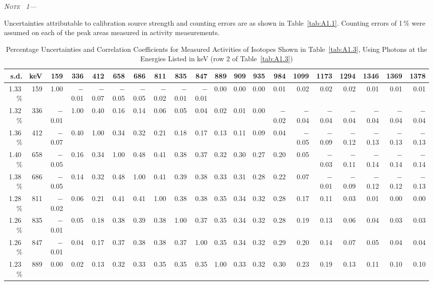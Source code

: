 \documentclass[12pt]{article}
\newenvironment{astmnote}[1][\relax]{%
  \par\smallskip\noindent\textit{N\textsc{ote}%
  \ifx#1\relax\else~#1\fi---}\ignorespaces
}{%
  \par\smallskip
}
\begin{document}
\begin{landscape}
\begin{table}[p]
\centering
\caption{Percentage Uncertainties and Correlation Coefficients for Measured Activities of
Isotopes Shown in Table~\ref{tab:A1.3}, Using Photons at the Energies Listed in keV (row 2 of
Table~\ref{tab:A1.3})}
\label{tab:A1.4}
\begin{astmnote}[1]
Uncertainties attributable to calibration source strength and counting errors are as shown
in Table~\ref{tab:A1.1}. Counting errors of 1\,\% were assumed on each of the peak areas
measured in activity measurements.
\end{astmnote}
\small
\setlength{\tabcolsep}{3pt}
\begin{tabular}{rr rrrrrrrrrrrrrrrrrr}
\toprule
s.d. & keV & 159 & 336 & 412 & 658 & 686 & 811 & 835 & 847 & 889 & 909 & 935 & 984 & 1099 & 1173 & 1294 & 1346 & 1369 & 1378 \\
\midrule
1.33\,\% & 159  & 1.00  & $-$0.01 & $-$0.07 & $-$0.05 & $-$0.05 & $-$0.02 & $-$0.01 & $-$0.01 & 0.00 & 0.00 & 0.00 & 0.01 & 0.02 & 0.02 & 0.02 & 0.01 & 0.01 & 0.01 \\
1.32\,\% & 336  & $-$0.01 & 1.00 & 0.40 & 0.16 & 0.14 & 0.06 & 0.05 & 0.04 & 0.02 & 0.01 & 0.00 & $-$0.02 & $-$0.04 & $-$0.04 & $-$0.04 & $-$0.04 & $-$0.04 & $-$0.04 \\
1.36\,\% & 412  & $-$0.07 & 0.40 & 1.00 & 0.34 & 0.32 & 0.21 & 0.18 & 0.17 & 0.13 & 0.11 & 0.09 & 0.04 & $-$0.05 & $-$0.09 & $-$0.12 & $-$0.13 & $-$0.13 & $-$0.13 \\
1.40\,\% & 658  & $-$0.05 & 0.16 & 0.34 & 1.00 & 0.48 & 0.41 & 0.38 & 0.37 & 0.32 & 0.30 & 0.27 & 0.20 & 0.05 & $-$0.03 & $-$0.11 & $-$0.14 & $-$0.14 & $-$0.14 \\
1.38\,\% & 686  & $-$0.05 & 0.14 & 0.32 & 0.48 & 1.00 & 0.41 & 0.39 & 0.38 & 0.33 & 0.31 & 0.28 & 0.22 & 0.07 & $-$0.01 & $-$0.09 & $-$0.12 & $-$0.12 & $-$0.13 \\
1.28\,\% & 811  & $-$0.02 & 0.06 & 0.21 & 0.41 & 0.41 & 1.00 & 0.38 & 0.38 & 0.35 & 0.34 & 0.32 & 0.28 & 0.17 & 0.11 & 0.03 & 0.01 & 0.00 & 0.00 \\
1.26\,\% & 835  & $-$0.01 & 0.05 & 0.18 & 0.38 & 0.39 & 0.38 & 1.00 & 0.37 & 0.35 & 0.34 & 0.32 & 0.28 & 0.19 & 0.13 & 0.06 & 0.04 & 0.03 & 0.03 \\
1.26\,\% & 847  & $-$0.01 & 0.04 & 0.17 & 0.37 & 0.38 & 0.38 & 0.37 & 1.00 & 0.35 & 0.34 & 0.32 & 0.29 & 0.20 & 0.14 & 0.07 & 0.05 & 0.04 & 0.04 \\
1.23\,\% & 889  & 0.00 & 0.02 & 0.13 & 0.32 & 0.33 & 0.35 & 0.35 & 0.35 & 1.00 & 0.33 & 0.32 & 0.30 & 0.23 & 0.19 & 0.13 & 0.11 & 0.10 & 0.10 \\

\end{tabular}
\end{table}
\end{landscape}
\end{document}
